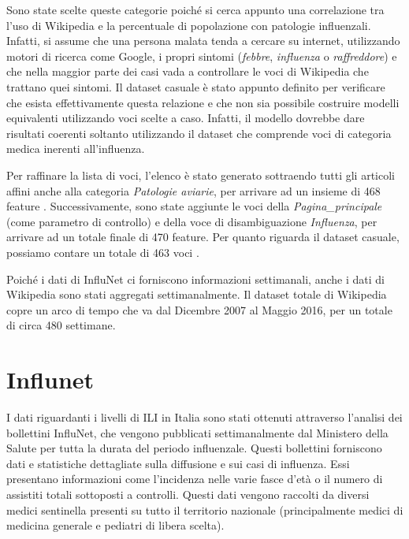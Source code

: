Sono state scelte queste categorie poiché si cerca appunto una correlazione tra l'uso di Wikipedia e la percentuale di 
popolazione con patologie influenzali. Infatti, si assume che una persona malata tenda a cercare su internet, utilizzando 
motori di ricerca come Google, i propri sintomi (\textit{febbre}, \textit{influenza} o \textit{raffreddore}) e che nella 
maggior parte dei casi vada a controllare le voci di Wikipedia che trattano quei sintomi. Il dataset casuale è stato appunto 
definito per verificare che esista effettivamente questa relazione e che non sia possibile costruire modelli equivalenti 
utilizzando voci scelte a caso. Infatti, il modello dovrebbe dare risultati coerenti soltanto utilizzando il dataset che 
comprende voci di categoria medica inerenti all'influenza. 
\bigskip 

Per raffinare la lista di voci, l'elenco è stato generato sottraendo tutti gli articoli affini anche alla categoria 
\textit{Patologie aviarie}, per arrivare ad un insieme di 468 feature \cite{PetScanQuery}. Successivamente, sono state 
aggiunte le voci della \textit{Pagina_principale} (come parametro di controllo) e della voce di disambiguazione 
\textit{Influenza}, per arrivare ad un totale finale di 470 feature. Per quanto riguarda il dataset casuale, possiamo contare 
un totale di 463 voci \cite{PetScanRandom}.
\bigskip

Poiché i dati di InfluNet ci forniscono informazioni settimanali, anche i dati di Wikipedia sono stati aggregati 
settimanalmente. Il dataset totale di Wikipedia copre un arco di tempo che va dal Dicembre 2007 al Maggio 2016, per un totale 
di circa 480 settimane.

\section{Influnet}
\bigskip 

I dati riguardanti i livelli di ILI in Italia sono stati ottenuti attraverso l'analisi dei bollettini InfluNet,
che vengono pubblicati settimanalmente dal Ministero della Salute per tutta la durata del periodo influenzale.
Questi bollettini forniscono dati e statistiche dettagliate sulla diffusione e sui casi di influenza. Essi presentano 
informazioni come l'incidenza nelle varie fasce d'età o il numero di assistiti totali sottoposti a controlli. 
Questi dati vengono raccolti da diversi medici sentinella presenti su tutto il territorio nazionale (principalmente medici di medicina generale e pediatri di libera scelta).
\bigskip

